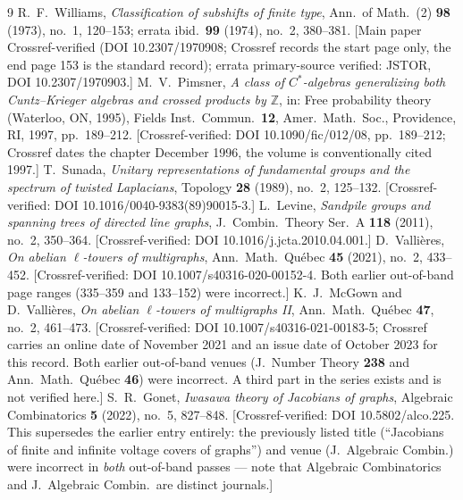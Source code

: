 \documentclass[11pt]{amsart}
\numberwithin{equation}{section}
\theoremstyle{definition}
\theoremstyle{remark}
\newcommand{\Z}{\mathbb{Z}}
\begin{document}
\begin{thebibliography}{9}
 R.~F.~Williams, \emph{Classification of subshifts of finite type},
Ann.\ of Math.\ (2) \textbf{98} (1973), no.~1, 120--153; errata ibid.\ \textbf{99}
(1974), no.~2, 380--381. [Main paper Crossref-verified (DOI 10.2307/1970908; Crossref
records the start page only, the end page 153 is the standard record); errata
primary-source verified: JSTOR, DOI 10.2307/1970903.]
 M.~V.~Pimsner, \emph{A class of $C^*$-algebras generalizing both
Cuntz--Krieger algebras and crossed products by $\Z$}, in: Free probability theory
(Waterloo, ON, 1995), Fields Inst.\ Commun.\ \textbf{12}, Amer.\ Math.\ Soc.,
Providence, RI, 1997, pp.~189--212. [Crossref-verified: DOI 10.1090/fic/012/08,
pp.~189--212; Crossref dates the chapter December 1996, the volume is conventionally
cited 1997.]
 T.~Sunada, \emph{Unitary representations of fundamental groups and
the spectrum of twisted Laplacians}, Topology \textbf{28} (1989), no.~2, 125--132.
[Crossref-verified: DOI 10.1016/0040-9383(89)90015-3.]
 L.~Levine, \emph{Sandpile groups and spanning trees of directed line
graphs}, J.\ Combin.\ Theory Ser.\ A \textbf{118} (2011), no.~2, 350--364.
[Crossref-verified: DOI 10.1016/j.jcta.2010.04.001.]
 D.~Vallières, \emph{On abelian $\ell$-towers of multigraphs},
Ann.\ Math.\ Qu\'ebec \textbf{45} (2021), no.~2, 433--452. [Crossref-verified:
DOI 10.1007/s40316-020-00152-4. Both earlier out-of-band page ranges (335--359 and
133--152) were incorrect.]
 K.~J.~McGown and D.~Vallières, \emph{On abelian
$\ell$-towers of multigraphs II}, Ann.\ Math.\ Qu\'ebec \textbf{47}, no.~2, 461--473.
[Crossref-verified: DOI 10.1007/s40316-021-00183-5; Crossref carries an online date of
November 2021 and an issue date of October 2023 for this record. Both earlier
out-of-band venues (J.\ Number Theory \textbf{238} and Ann.\ Math.\ Qu\'ebec
\textbf{46}) were incorrect. A third part in the series exists and is not verified
here.]
 S.~R.~Gonet, \emph{Iwasawa theory of Jacobians of graphs}, Algebraic
Combinatorics \textbf{5} (2022), no.~5, 827--848. [Crossref-verified:
DOI 10.5802/alco.225. This supersedes the earlier entry entirely: the previously
listed title (``Jacobians of finite and infinite voltage covers of graphs'') and venue
(J.\ Algebraic Combin.) were incorrect in \emph{both} out-of-band passes --- note that
Algebraic Combinatorics and J.\ Algebraic Combin.\ are distinct journals.]
\end{thebibliography}
\end{document}
